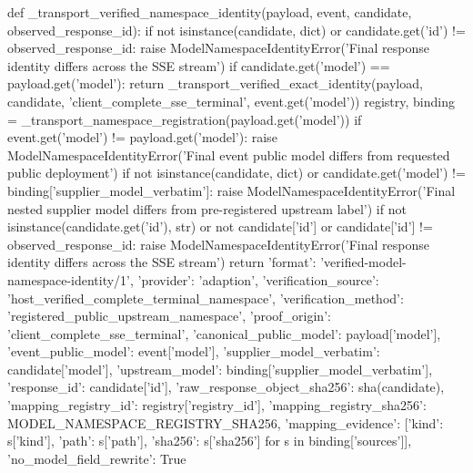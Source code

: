{def _transport_verified_namespace_identity(payload, event, candidate, observed_response_id):
    if not isinstance(candidate, dict) or candidate.get('id') != observed_response_id:
        raise ModelNamespaceIdentityError('Final response identity differs across the SSE stream')
    if candidate.get('model') == payload.get('model'):
        return _transport_verified_exact_identity(payload, candidate, 'client_complete_sse_terminal', event.get('model'))
    registry, binding = _transport_namespace_registration(payload.get('model'))
    if event.get('model') != payload.get('model'):
        raise ModelNamespaceIdentityError('Final event public model differs from requested public deployment')
    if not isinstance(candidate, dict) or candidate.get('model') != binding['supplier_model_verbatim']:
        raise ModelNamespaceIdentityError('Final nested supplier model differs from pre-registered upstream label')
    if not isinstance(candidate.get('id'), str) or not candidate['id'] or candidate['id'] != observed_response_id:
        raise ModelNamespaceIdentityError('Final response identity differs across the SSE stream')
    return {'format': 'verified-model-namespace-identity/1', 'provider': 'adaption',
        'verification_source': 'host_verified_complete_terminal_namespace',
        'verification_method': 'registered_public_upstream_namespace',
        'proof_origin': 'client_complete_sse_terminal',
        'canonical_public_model': payload['model'], 'event_public_model': event['model'],
        'supplier_model_verbatim': candidate['model'], 'upstream_model': binding['supplier_model_verbatim'],
        'response_id': candidate['id'], 'raw_response_object_sha256': sha(candidate),
        'mapping_registry_id': registry['registry_id'],
        'mapping_registry_sha256': MODEL_NAMESPACE_REGISTRY_SHA256,
        'mapping_evidence': [{'kind': s['kind'], 'path': s['path'], 'sha256': s['sha256']} for s in binding['sources']],
        'no_model_field_rewrite': True}


}
